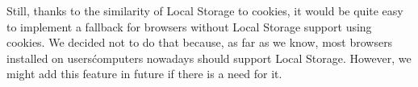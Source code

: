 {Still, thanks to the similarity of Local Storage to cookies, it would be quite easy to implement a fallback for browsers without Local Storage support using cookies. We decided not to do that because, as far as we know, most browsers installed on users\' computers nowadays should support Local Storage. However, we might add this feature in future if there is a need for it.

%
%
}
